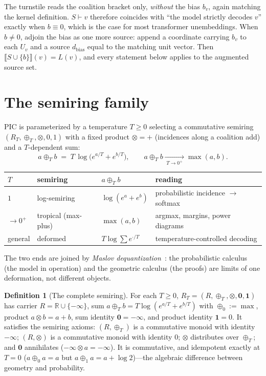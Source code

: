 \documentclass[11pt]{article}
\theoremstyle{definition}
\newtheorem{definition}{Definition}[section]
\theoremstyle{plain}
\theoremstyle{remark}
\newcommand{\RR}{\mathbb{R}}
\begin{document}
The turnstile reads the coalition bracket only, \emph{without} the bias $b_v$, again matching the kernel
definition. $S\vdash v$ therefore coincides with ``the model strictly decodes $v$'' exactly when $b\equiv0$,
which is the case for most transformer unembeddings. When $b\neq0$, adjoin the bias as one more source:
append a coordinate carrying $b_v$ to each $U_v$ and a source $d_{\mathrm{bias}}$ equal to the matching unit vector.
Then $\llbracket S\cup\{b\}\rrbracket(v)=L(v)$, and every statement below applies to the augmented source set.

\section{The semiring family}\label{sec:semiring}

PIC is parameterized by a temperature $T\ge 0$ selecting a commutative semiring
$(R_T,\oplus_T,\otimes,0,1)$ with a fixed product $\otimes=+$ (incidences along a coalition add) and a
$T$-dependent sum:
\[
  a\oplus_T b \;=\; T\,\log\!\bigl(e^{a/T}+e^{b/T}\bigr),
  \qquad
  a\oplus_T b \xrightarrow[\;T\to 0^+\;]{} \max(a,b).
\]

\begin{center}
\begin{tabular}{@{}llll@{}}
\toprule
$T$ & semiring & $a\oplus_T b$ & reading \\
\midrule
$1$ & log-semiring & $\log(e^a+e^b)$ & probabilistic incidence $\to$ softmax \\
$\to 0^+$ & tropical (max-plus) & $\max(a,b)$ & argmax, margins, power diagrams \\
general & deformed & $T\log\sum e^{\cdot/T}$ & temperature-controlled decoding \\
\bottomrule
\end{tabular}
\end{center}

The two ends are joined by \emph{Maslov dequantization}~\cite{litvinov2007maslov}: the probabilistic calculus (the model in
operation) and the geometric calculus (the proofs) are limits of one deformation, not different objects.

\begin{definition}[The complete semiring]\label{def:semiring}
For each $T\ge0$, $R_T=(R,\oplus_T,\otimes,\mathbf{0},\mathbf{1})$ has carrier $R=\RR\cup\{-\infty\}$,
sum $a\oplus_T b=T\log(e^{a/T}+e^{b/T})$ with $\oplus_0:=\max$, product $a\otimes b=a+b$, sum identity
$\mathbf{0}=-\infty$, and product identity $\mathbf{1}=0$. It satisfies the semiring axioms: $(R,\oplus_T)$
is a commutative monoid with identity $-\infty$; $(R,\otimes)$ is a commutative monoid with identity $0$;
$\otimes$ distributes over $\oplus_T$; and $\mathbf{0}$ annihilates ($-\infty\otimes a=-\infty$). It is
commutative, and idempotent exactly at $T=0$ ($a\oplus_0 a=a$ but $a\oplus_1 a=a+\log 2$)---the algebraic
difference between geometry and probability.
\end{definition}
\end{document}
